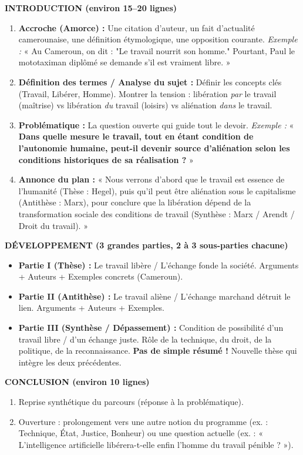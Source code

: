 \documentclass[11pt]{article}
\begin{document}
\begin{methode}
\textbf{INTRODUCTION (environ 15--20 lignes)}
\begin{enumerate}
    \item \textbf{Accroche (Amorce) :} Une citation d'auteur, un fait d'actualité camerounaise, une définition étymologique, une opposition courante. \emph{Exemple :} « Au Cameroun, on dit : "Le travail nourrit son homme." Pourtant, Paul le mototaximan diplômé se demande s'il est vraiment libre. »
    \item \textbf{Définition des termes / Analyse du sujet :} Définir les concepts clés (Travail, Libérer, Homme). Montrer la tension : libération \emph{par} le travail (maîtrise) vs libération \emph{du} travail (loisirs) vs aliénation \emph{dans} le travail.
    \item \textbf{Problématique :} La question ouverte qui guide tout le devoir. \emph{Exemple :} « \textbf{Dans quelle mesure le travail, tout en étant condition de l'autonomie humaine, peut-il devenir source d'aliénation selon les conditions historiques de sa réalisation ?} »
    \item \textbf{Annonce du plan :} « Nous verrons d'abord que le travail est essence de l'humanité (Thèse : Hegel), puis qu'il peut être aliénation sous le capitalisme (Antithèse : Marx), pour conclure que la libération dépend de la transformation sociale des conditions de travail (Synthèse : Marx / Arendt / Droit du travail). »
\end{enumerate}

\textbf{DÉVELOPPEMENT (3 grandes parties, 2 à 3 sous-parties chacune)}
\begin{itemize}
    \item \textbf{Partie I (Thèse) :} Le travail libère / L'échange fonde la société. Arguments + Auteurs + Exemples concrets (Cameroun).
    \item \textbf{Partie II (Antithèse) :} Le travail aliène / L'échange marchand détruit le lien. Arguments + Auteurs + Exemples.
    \item \textbf{Partie III (Synthèse / Dépassement) :} Condition de possibilité d'un travail libre / d'un échange juste. Rôle de la technique, du droit, de la politique, de la reconnaissance. \textbf{Pas de simple résumé !} Nouvelle thèse qui intègre les deux précédentes.
\end{itemize}

\textbf{CONCLUSION (environ 10 lignes)}
\begin{enumerate}
    \item Reprise synthétique du parcours (réponse à la problématique).
    \item Ouverture : prolongement vers une autre notion du programme (ex. : Technique, État, Justice, Bonheur) ou une question actuelle (ex. : « L'intelligence artificielle libérera-t-elle enfin l'homme du travail pénible ? »).
\end{enumerate}
\end{methode}
\end{document}
